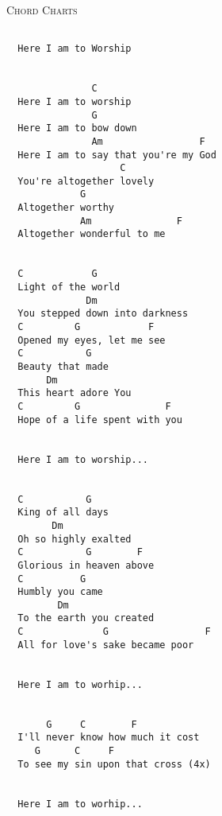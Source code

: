\documentclass[10pt,oneside,footinclude=true,headinclude=true]{scrbook} %
\makeatletter
\newcommand{\verbatimfont}[1]{\renewcommand{\verbatim@font}{#1}}
\newcommand\songtitle[1]{
	\hspace*{-3.7mm}\LARGE\textsc{#1}
}
\makeatother
\begin{document}
\newpage
\bigskip  
\songtitle{Chord Charts}
\begin{verbatim}

  Here I am to Worship


               C
  Here I am to worship
               G
  Here I am to bow down
               Am                 F
  Here I am to say that you're my God
                    C
  You're altogether lovely
             G
  Altogether worthy
             Am               F
  Altogether wonderful to me
  

  C            G
  Light of the world
              Dm
  You stepped down into darkness
  C         G            F
  Opened my eyes, let me see
  C           G
  Beauty that made
       Dm
  This heart adore You
  C         G               F
  Hope of a life spent with you


  Here I am to worship...
  

  C           G
  King of all days
        Dm
  Oh so highly exalted
  C           G        F
  Glorious in heaven above
  C          G
  Humbly you came
         Dm
  To the earth you created
  C              G                 F
  All for love's sake became poor
  

  Here I am to worhip...
  

       G     C        F
  I'll never know how much it cost
     G      C     F
  To see my sin upon that cross (4x)

  
  Here I am to worhip...
\end{verbatim}
\verbatimfont{\ttfamily\Large}
\newpage
\bigskip  
\end{document}
